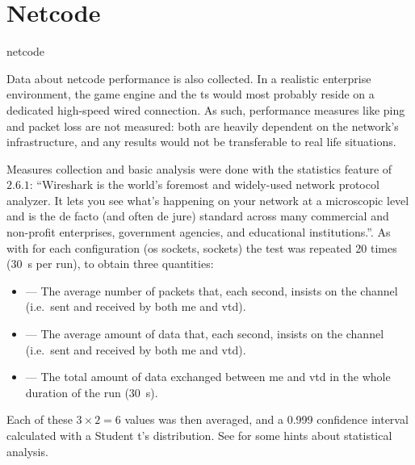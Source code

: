 \section{Netcode}\label{sc:performance:netcode}

\begin{definition}{netcode}
\end{definition}



Data about \gls{netcode} performance is also collected. In a realistic enterprise environment, the game engine and the \gls{ts} would most probably reside on a dedicated high-speed wired connection. As such, performance measures like ping and packet loss are not measured: both are heavily dependent on the network's infrastructure, and any results would not be transferable to real life situations.

Measures collection and basic analysis were done with the statistics feature of  $2.6.1$: \enquote{Wireshark is the world’s foremost and widely-used network protocol analyzer. It lets you see what’s happening on your network at a microscopic level and is the de facto (and often de jure) standard across many commercial and non-profit enterprises, government agencies, and educational institutions.}{\cite{performance:wireshark}}. As with  for each configuration (\gls{os} sockets,  sockets) the test was repeated \num{20} times (\SI{30}{\second} per run), to obtain three quantities:

\begin{itemize}
	\item {} --- The average number of packets that, each second, insists on the channel (i.e.\ sent and received by both \gls{me} and \gls{vtd}).
	\item {} --- The average amount of data that, each second, insists on the channel (i.e.\ sent and received by both \gls{me} and \gls{vtd}).
	\item {} --- The total amount of data exchanged between \gls{me} and \gls{vtd} in the whole duration of the run (\SI{30}{\second}).
\end{itemize}

\FLOATnoindent Each of these $3\times2=6$ values was then averaged, and a \num{0,999} confidence interval calculated with a Student t's distribution. See  for some hints about statistical analysis.


